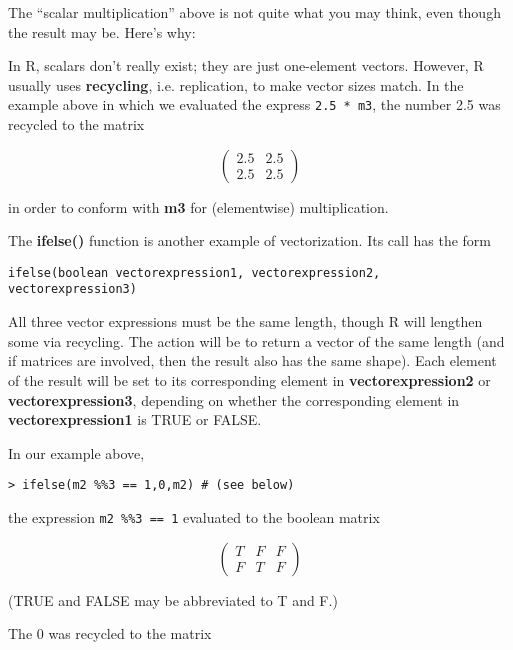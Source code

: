 The ``scalar multiplication'' above is not quite what you may think,
even though the result may be.  Here's why:

In R, scalars don't really exist; they are just one-element vectors.
However, R usually uses {\bf recycling}, i.e. replication, to make
vector sizes match.  In the example above in which we evaluated the
express \verb^2.5 * m3^, the number 2.5 was recycled to the matrix

\begin{equation}
\left (
\begin{array}{rr}
2.5 & 2.5 \\
2.5 & 2.5
\end{array}
\right )
\end{equation}

in order to conform with {\bf m3} for (elementwise) multiplication.

The {\bf ifelse()} function is another example of vectorization.  Its
call has the form

\begin{lstlisting}
ifelse(boolean vectorexpression1, vectorexpression2, vectorexpression3)
\end{lstlisting}

All three vector expressions must be the same length, though R will
lengthen some via recycling.  The action will be to return a vector of
the same length (and if matrices are involved, then the result also has
the same shape).  Each element of the result will be set to its
corresponding element in {\bf vectorexpression2} or {\bf
vectorexpression3}, depending on whether the corresponding element in
{\bf vectorexpression1} is TRUE or FALSE.

In our example above,

\begin{lstlisting}
> ifelse(m2 %%3 == 1,0,m2) # (see below)
\end{lstlisting}

the expression \verb^m2 %%3 == 1^ evaluated to the boolean matrix

\begin{equation}
\left (
\begin{array}{rrr}
T & F & F\\
F & T & F
\end{array}
\right )
\end{equation}

(TRUE and FALSE may be abbreviated to T and F.)

The 0 was recycled to the matrix

